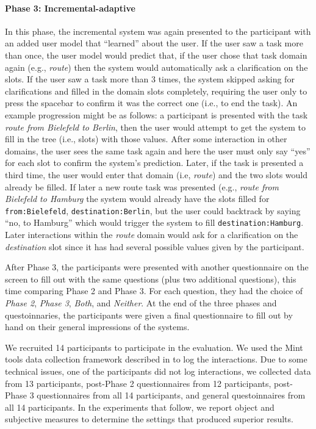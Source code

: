 \documentclass[11pt]{article}
\begin{document}
\paragraph{Phase 3: Incremental-adaptive} In this phase, the incremental system was again presented to the participant with an added user model that ``learned'' about the user. If the user saw a task more than once, the user model would predict that, if the user chose that task domain again (e.g., \emph{route}) then the system would automatically ask a clarification on the slots. If the user saw a task more than 3 times, the system skipped asking for clarifications and filled in the domain slots completely, requiring the user only to press the spacebar to confirm it was the correct one (i.e., to end the task). An example progression might be as follows: a participant is presented with the task \emph{route from Bielefeld to Berlin}, then the user would attempt to get the system to fill in the tree (i.e., slots) with those values. After some interaction in other domains, the user sees the same task again and here the user must only say ``yes'' for each slot to confirm the system's prediction. Later, if the task is presented a third time, the user would enter that domain (i.e, \emph{route}) and the two slots would already be filled. If later a new route task was presented (e.g., \emph{route from Bielefeld to Hamburg} the system would already have the slots filled for \texttt{from:Bielefeld}, \texttt{destination:Berlin}, but the user could backtrack by saying ``no, to Hamburg'' which would trigger the system to fill \texttt{destination:Hamburg}. Later interactions within the \emph{route} domain would ask for a clarification on the \emph{destination} slot since it has had several possible values given by the participant. 

After Phase 3, the participants were presented with another questionnaire on the screen to fill out with the same questions (plus two additional questions), this time comparing Phase 2 and Phase 3. For each question, they had the choice of \emph{Phase 2}, \emph{Phase 3}, \emph{Both}, and \emph{Neither}. At the end of the three phases and questoinnaries, the participants were given a final questionnaire to fill out by hand on their general impressions of the systems. 

We recruited 14 participants to participate in the evaluation. We used the Mint tools data collection framework described in  to log the interactions. Due to some technical issues, one of the participants did not log interactions, we collected data from 13 participants, post-Phase 2 questionnaires from 12 participants,  post-Phase 3 questionnaires from all 14 participants, and general questoinnaires from all 14 participants. In the experiments that follow, we report object and subjective measures to determine the settings that produced superior results.
\end{document}
